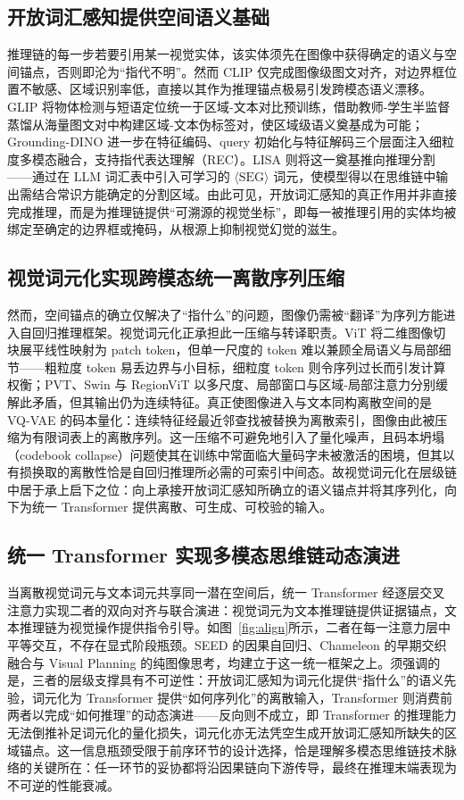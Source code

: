 \documentclass[twocolumn]{ctexart}
\begin{document}
\subsection{开放词汇感知提供空间语义基础}\label{sec:hier:ovp}
推理链的每一步若要引用某一视觉实体，该实体须先在图像中获得确定的语义与空间锚点，否则即沦为“指代不明”。然而 CLIP\cite{radford2021clip} 仅完成图像级图文对齐，对边界框位置不敏感、区域识别率低，直接以其作为推理锚点极易引发跨模态语义漂移。GLIP\cite{li2022gllip} 将物体检测与短语定位统一于区域-文本对比预训练，借助教师-学生半监督蒸馏从海量图文对中构建区域-文本伪标签对，使区域级语义奠基成为可能；Grounding-DINO\cite{liu2024groundingdino} 进一步在特征编码、query 初始化与特征解码三个层面注入细粒度多模态融合，支持指代表达理解（REC）。LISA\cite{li2023lisa} 则将这一奠基推向推理分割——通过在 LLM 词汇表中引入可学习的 $\langle\text{SEG}\rangle$ 词元，使模型得以在思维链中输出需结合常识方能确定的分割区域。由此可见，开放词汇感知的真正作用并非直接完成推理，而是为推理链提供“可溯源的视觉坐标”，即每一被推理引用的实体均被绑定至确定的边界框或掩码，从根源上抑制视觉幻觉的滋生。

\subsection{视觉词元化实现跨模态统一离散序列压缩}\label{sec:hier:vt}
然而，空间锚点的确立仅解决了“指什么”的问题，图像仍需被“翻译”为序列方能进入自回归推理框架。视觉词元化正承担此一压缩与转译职责。ViT 将二维图像切块展平线性映射为 patch token，但单一尺度的 token 难以兼顾全局语义与局部细节——粗粒度 token 易丢边界与小目标，细粒度 token 则令序列过长而引发计算权衡；PVT、Swin 与 RegionViT 以多尺度、局部窗口与区域-局部注意力分别缓解此矛盾，但其输出仍为连续特征。真正使图像进入与文本同构离散空间的是 VQ-VAE\cite{van2017vqvae} 的码本量化：连续特征经最近邻查找被替换为离散索引，图像由此被压缩为有限词表上的离散序列。这一压缩不可避免地引入了量化噪声，且码本坍塌（codebook collapse）问题使其在训练中常面临大量码字未被激活的困境，但其以有损换取的离散性恰是自回归推理所必需的可索引中间态。故视觉词元化在层级链中居于承上启下之位：向上承接开放词汇感知所确立的语义锚点并将其序列化，向下为统一 Transformer 提供离散、可生成、可校验的输入。

\subsection{统一 Transformer 实现多模态思维链动态演进}\label{sec:hier:unified}
当离散视觉词元与文本词元共享同一潜在空间后，统一 Transformer 经逐层交叉注意力实现二者的双向对齐与联合演进：视觉词元为文本推理链提供证据锚点，文本推理链为视觉操作提供指令引导。如图~\ref{fig:align}所示，二者在每一注意力层中平等交互，不存在显式阶段瓶颈。SEED\cite{ge2023seed} 的因果自回归、Chameleon\cite{team2024chameleon} 的早期交织融合与 Visual Planning 的纯图像思考，均建立于这一统一框架之上。须强调的是，三者的层级支撑具有不可逆性：开放词汇感知为词元化提供“指什么”的语义先验，词元化为 Transformer 提供“如何序列化”的离散输入，Transformer 则消费前两者以完成“如何推理”的动态演进——反向则不成立，即 Transformer 的推理能力无法倒推补足词元化的量化损失，词元化亦无法凭空生成开放词汇感知所缺失的区域锚点。这一信息瓶颈受限于前序环节的设计选择，恰是理解多模态思维链技术脉络的关键所在：任一环节的妥协都将沿因果链向下游传导，最终在推理末端表现为不可逆的性能衰减。
\end{document}
